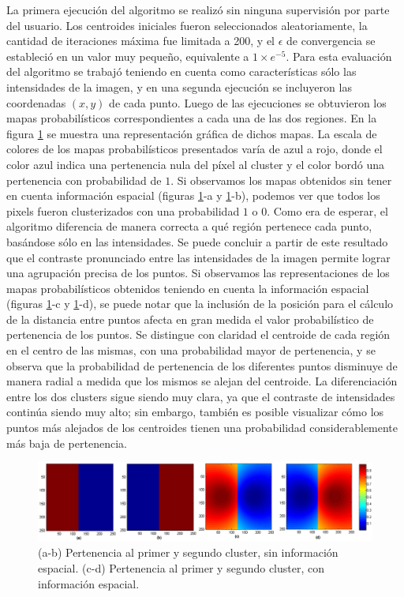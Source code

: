 La primera ejecución del algoritmo se realizó sin ninguna supervisión por parte del usuario. Los centroides iniciales fueron seleccionados aleatoriamente, la cantidad de iteraciones máxima fue limitada a 200, y el $\epsilon$ de convergencia se estableció en un valor muy pequeño, equivalente a $1 \times e^{-5}$. Para esta evaluación del algoritmo se trabajó teniendo en cuenta como características sólo las intensidades de la imagen, y en una segunda ejecución se incluyeron las coordenadas $(x,y)$ de cada punto. Luego de las ejecuciones se obtuvieron los mapas probabilísticos correspondientes a cada una de las dos regiones. En la figura \ref{fig:ejecucion1_mitad_mitad} se muestra una representación gráfica de dichos mapas. La escala de colores de los mapas probabilísticos presentados varía de azul a rojo, donde el color azul indica una pertenencia nula del píxel al cluster y el color bordó una pertenencia con probabilidad de $1$.
Si observamos los mapas obtenidos sin tener en cuenta información espacial (figuras \ref{fig:ejecucion1_mitad_mitad}-a y \ref{fig:ejecucion1_mitad_mitad}-b), podemos ver que todos los pixels fueron clusterizados con una probabilidad $1$ o $0$. Como era de esperar, el algoritmo diferencia de manera correcta a qué región pertenece cada punto, basándose sólo en las intensidades. Se puede concluir a partir de este resultado que el contraste pronunciado entre las intensidades de la imagen permite lograr una agrupación precisa de los puntos.
Si observamos las representaciones de los mapas probabilísticos obtenidos teniendo en cuenta la información espacial (figuras \ref{fig:ejecucion1_mitad_mitad}-c y \ref{fig:ejecucion1_mitad_mitad}-d), se puede notar que la inclusión de la posición para el cálculo de la distancia entre puntos afecta en gran medida el valor probabilístico de pertenencia de los puntos. Se distingue con claridad el centroide de cada región en el centro de las mismas, con una probabilidad mayor de pertenencia, y se observa que la probabilidad de pertenencia de los diferentes puntos disminuye de manera radial a medida que los mismos se alejan del centroide. La diferenciación entre los dos clusters sigue siendo muy clara, ya que el contraste de intensidades continúa siendo muy alto; sin embargo, también es posible visualizar cómo los puntos más alejados de los centroides tienen una probabilidad considerablemente más baja de pertenencia. 

\begin{figure}[h]
\centering
\includegraphics[scale=0.08]{images/mitad_mitad_001.jpg}
\caption{(a-b) Pertenencia al primer y segundo cluster, sin información espacial. (c-d) Pertenencia al primer y segundo cluster, con información espacial.}
\label{fig:ejecucion1_mitad_mitad}
\end{figure}

